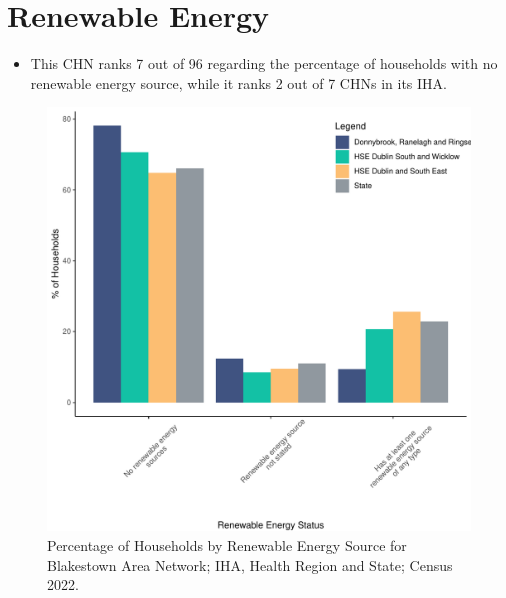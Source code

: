 \documentclass{article}
\begin{document}
\section{Renewable Energy}\label{sect:RE}
\begin{itemize}
\item This CHN ranks  7 out of 96 regarding the percentage of households with no renewable energy source, while it ranks   2 out of 7 CHNs in its IHA.
\end{itemize}
\begin{figure}[H]
	\centering
	\includegraphics[width = 140mm]{../figures/RenewableEnergyED.pdf}
	\caption{Percentage of Households by Renewable Energy Source for Blakestown Area Network; IHA, Health Region and State; Census 2022.}
	\label{fig:vbnv}
	\end{figure}
\end{document}
